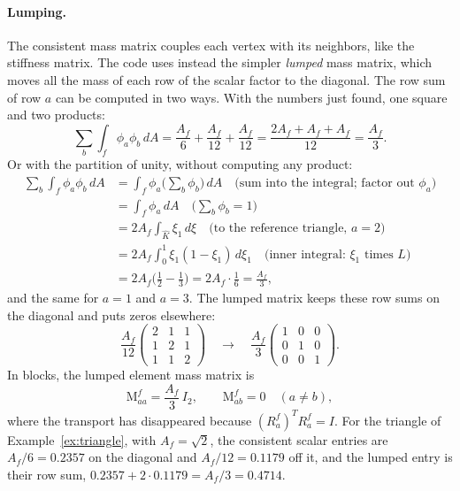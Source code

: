 \paragraph{Lumping.} The consistent mass matrix couples each vertex with its neighbors, like the stiffness matrix. The code uses instead the simpler \emph{lumped} mass matrix, which moves all the mass of each row of the scalar factor to the diagonal. The row sum of row $a$ can be computed in two ways. With the numbers just found, one square and two products:
\begin{equation*}
\sum_b \int_f \phi_a \phi_b\, dA = \frac{A_f}{6} + \frac{A_f}{12} + \frac{A_f}{12} = \frac{2A_f + A_f + A_f}{12} = \frac{A_f}{3} .
\end{equation*}
Or with the partition of unity, without computing any product:
\begin{align*}
\sum_b \int_f \phi_a \phi_b\, dA &= \int_f \phi_a \Big(\sum_b \phi_b\Big)\, dA \quad \text{(sum into the integral; factor out } \phi_a\text{)}\\
&= \int_f \phi_a\, dA \quad \Big(\textstyle\sum_b\phi_b = 1\Big)\\
&= 2A_f\int_{\hat K}\xi_1\, d\xi \quad \text{(to the reference triangle, } a = 2\text{)}\\
&= 2A_f\int_0^1 \xi_1(1 - \xi_1)\, d\xi_1 \quad \text{(inner integral: } \xi_1 \text{ times } L\text{)}\\
&= 2A_f\Big(\frac12 - \frac13\Big) = 2A_f\cdot\frac16 = \frac{A_f}{3} ,
\end{align*}
and the same for $a = 1$ and $a = 3$. The lumped matrix keeps these row sums on the diagonal and puts zeros elsewhere:
\begin{equation*}
\frac{A_f}{12}\begin{pmatrix} 2 & 1 & 1 \\ 1 & 2 & 1 \\ 1 & 1 & 2\end{pmatrix} \quad\longrightarrow\quad \frac{A_f}{3}\begin{pmatrix} 1 & 0 & 0 \\ 0 & 1 & 0 \\ 0 & 0 & 1\end{pmatrix} .
\end{equation*}
In blocks, the lumped element mass matrix is
\begin{equation}
\label{eqn:lumped_mass}
\mathrm M^f_{aa} = \frac{A_f}{3}\, I_2, \qquad \mathrm M^f_{ab} = 0 \quad (a \neq b),
\end{equation}
where the transport has disappeared because $(R_a^f)^T R_a^f = I$. For the triangle of Example~\ref{ex:triangle}, with $A_f = \sqrt 2$, the consistent scalar entries are $A_f/6 = 0.2357$ on the diagonal and $A_f/12 = 0.1179$ off it, and the lumped entry is their row sum, $0.2357 + 2\cdot 0.1179 = A_f/3 = 0.4714$.

